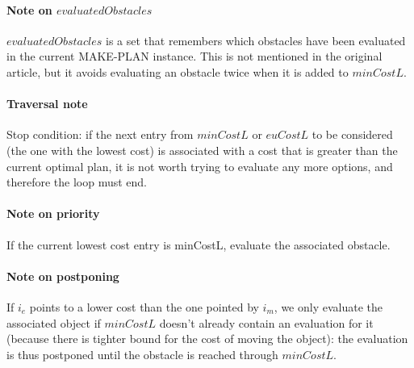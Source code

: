 \paragraph{Note on $evaluatedObstacles$}\label{evaluated_obstacles_note} $evaluatedObstacles$ is a set that remembers which obstacles have been evaluated in the current MAKE-PLAN instance. This is not mentioned in the original article, but it avoids evaluating an obstacle twice when it is added to $minCostL$.

\paragraph{Traversal note}\label{list_traversal_note} Stop condition: if the next entry from $minCostL$ or $euCostL$ to be considered (the one with the lowest cost) is associated with a cost that is greater than the current optimal plan, it is not worth trying to evaluate any more options, and therefore the loop must end.

\paragraph{Note on priority}\label{minCostL_priority_note} If the current lowest cost entry is minCostL, evaluate the associated obstacle.

\paragraph{Note on postponing}\label{postponing_note} If $i_{e}$ points to a lower cost than the one pointed by $i_{m}$, we only evaluate the associated object if $minCostL$ doesn't already contain an evaluation for it (because there is tighter bound for the cost of moving the object): the evaluation is thus postponed until the obstacle is reached through $minCostL$.


